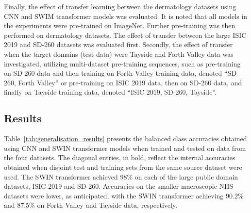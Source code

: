 Finally, the effect of transfer learning between the dermatology datasets using CNN and SWIM transformer models was evaluated. It is noted that all models in the experiments were pre-trained on ImageNet. Further pre-training was then performed on dermatology datasets. The effect of transfer between the large ISIC 2019 and SD-260 datasets was evaluated first. Secondly, the effect of transfer when the target domains (test data) were Tayside and Forth Valley data was investigated, utilizing multi-dataset pre-training sequences, such as pre-training on SD-260 data and then training on Forth Valley training data, denoted “SD-260, Forth Valley” or pre-training on ISIC 2019 data, then on SD-260 data, and finally on Tayside training data, denoted “ISIC 2019, SD-260, Tayside”.


\subsection{Results}
\label{subsec:generalisation_results}
Table~\ref{tab:generalisation_results} presents the balanced class accuracies obtained using CNN and SWIN transformer models when trained and tested on data from the four datasets. The diagonal entries, in bold, reflect the internal accuracies obtained when disjoint test and training sets from the same source dataset were used. The SWIN transformer achieved 98\% on each of the large public domain datasets, ISIC 2019 and SD-260. Accuracies on the smaller macroscopic NHS datasets were lower, as anticipated, with the SWIN transformer achieving 90.2\% and 87.5\% on Forth Valley and Tayside data, respectively.

\begin{table}[h]
	\centering
	\caption{Class-balanced accuracy when training and testing on the various datasets.}
	\label{tab:generalisation_results}
\end{table}

